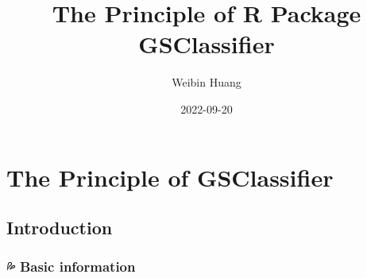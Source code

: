 \documentclass[
  12pt,
]{book}
\title{The Principle of R Package GSClassifier}
\author{Weibin Huang}
\date{2022-09-20}
\begin{document}
\maketitle

{
\hypersetup{linkcolor=}
\setcounter{tocdepth}{2}
\tableofcontents
}
\hypertarget{the-principle-of-gsclassifier}{%
\chapter{The Principle of GSClassifier}\label{the-principle-of-gsclassifier}}

\hypertarget{introduction}{%
\section{Introduction}\label{introduction}}

\hypertarget{basic-information}{%
\subsection{💦 Basic information}\label{basic-information}}
\end{document}
